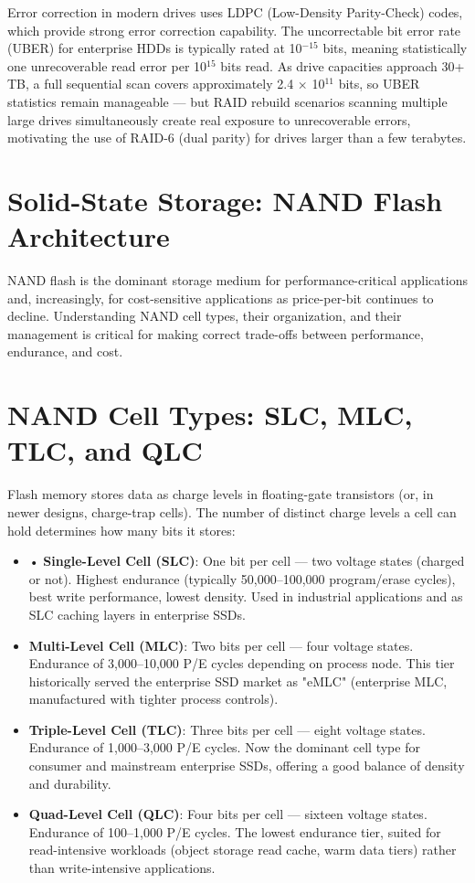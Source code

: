 Error correction in modern drives uses LDPC (Low-Density Parity-Check) codes, which provide strong error correction capability. The uncorrectable bit error rate (UBER) for enterprise HDDs is typically rated at 10$^{-15}$ bits, meaning statistically one unrecoverable read error per 10$^{15}$ bits read. As drive capacities approach 30+ TB, a full sequential scan covers approximately 2.4 $\times$ 10$^{11}$ bits, so UBER statistics remain manageable --- but RAID rebuild scenarios scanning multiple large drives simultaneously create real exposure to unrecoverable errors, motivating the use of RAID-6 (dual parity) for drives larger than a few terabytes.

\section{Solid-State Storage: NAND Flash Architecture}
NAND flash is the dominant storage medium for performance-critical applications and, increasingly, for cost-sensitive applications as price-per-bit continues to decline. Understanding NAND cell types, their organization, and their management is critical for making correct trade-offs between performance, endurance, and cost.

\section{NAND Cell Types: SLC, MLC, TLC, and QLC}
Flash memory stores data as charge levels in floating-gate transistors (or, in newer designs, charge-trap cells). The number of distinct charge levels a cell can hold determines how many bits it stores:

\begin{itemize}
  \item • \textbf{Single-Level Cell (SLC)}: One bit per cell --- two voltage states (charged or not). Highest endurance (typically 50,000--100,000 program/erase cycles), best write performance, lowest density. Used in industrial applications and as SLC caching layers in enterprise SSDs.
  \item \textbf{Multi-Level Cell (MLC)}: Two bits per cell --- four voltage states. Endurance of 3,000--10,000 P/E cycles depending on process node. This tier historically served the enterprise SSD market as "eMLC" (enterprise MLC, manufactured with tighter process controls).
  \item \textbf{Triple-Level Cell (TLC)}: Three bits per cell --- eight voltage states. Endurance of 1,000--3,000 P/E cycles. Now the dominant cell type for consumer and mainstream enterprise SSDs, offering a good balance of density and durability.
  \item \textbf{Quad-Level Cell (QLC)}: Four bits per cell --- sixteen voltage states. Endurance of 100--1,000 P/E cycles. The lowest endurance tier, suited for read-intensive workloads (object storage read cache, warm data tiers) rather than write-intensive applications.
\end{itemize}

